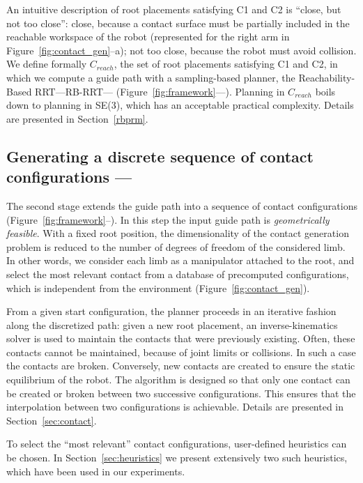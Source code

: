 An intuitive description of root placements satisfying C1 and C2 is ``close, but not too close'': close, because a contact surface must be partially included in the reachable workspace of the robot (represented for the right arm in Figure~\ref{fig:contact_gen}--a); not too close, because the robot must avoid collision. We define formally $C_{reach}$, the set of root placements satisfying C1 and C2, in which we compute a guide path with a sampling-based planner, the Reachability-Based RRT---RB-RRT--- (Figure~\ref{fig:framework}---\Pa). Planning in $C_{reach}$ boils down to planning in SE(3), which has an acceptable practical complexity.
%
Details are presented in Section~\ref{rbprm}.

\subsection{Generating a discrete sequence of contact configurations --- \Pb}

The second stage extends the guide path into a sequence of contact configurations (Figure~\ref{fig:framework}--\Pb). In this
step the input guide path is \textit{geometrically feasible}.
With a fixed root position, the dimensionality of the 
contact generation problem is reduced to the number of degrees of freedom of the considered limb. In other words, we consider each limb as a manipulator attached to the root, and select the most relevant contact from a database of precomputed configurations, which is independent from the environment (Figure~\ref{fig:contact_gen}).

From a given start configuration, the planner proceeds in an iterative fashion along the discretized path: given a new root placement, an inverse-kinematics solver 
is used to maintain the contacts that were previously existing. Often, these contacts cannot be maintained, because of joint limits or collisions.
In such a case the contacts are broken. Conversely, new contacts are created to ensure the static equilibrium of the robot.
The algorithm is designed so that only one contact can be created or broken between two successive configurations. This ensures that the interpolation between two configurations is achievable.
Details are presented in Section~\ref{sec:contact}. 

To select the ``most relevant'' contact configurations, user-defined heuristics can be chosen. In Section~\ref{sec:heuristics} we present extensively two such heuristics, which have been used in our experiments.


